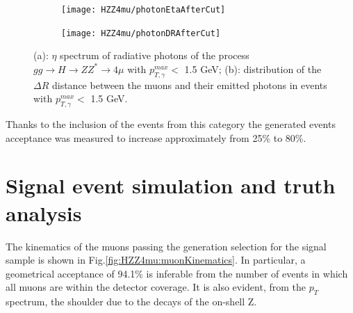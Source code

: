 \documentclass[a4paper,twoside,12pt]{book}
\begin{document}
\begin{figure}
\centering
\begin{subfigure}{.5\textwidth}
  \centering
  \texttt{[image: HZZ4mu/photonEtaAfterCut]}
  \caption{}
  \label{fig:HZZ4mu:photonEtaAfterCut}
\end{subfigure}%
\begin{subfigure}{.5\textwidth}
  \centering
  \texttt{[image: HZZ4mu/photonDRAfterCut]}
  \caption{}
  \label{fig:HZZ4mu:photonDRAfterCut}
\end{subfigure}
\caption{(a): $\eta$ spectrum of radiative photons of the process \\
	 \mbox{$gg \rightarrow H \rightarrow ZZ^* \rightarrow 4\mu$} with $p^{max}_{T, \gamma} <$ 1.5 GeV; 
	(b): distribution of the $\Delta R$ distance between the muons and their emitted photons in events with $p^{max}_{T, \gamma} <$ 1.5 GeV.}
\label{fig:HZZ4mu:genPhotonsAfterCut}
\end{figure}

Thanks to the inclusion of the events from this category the generated events acceptance was measured to increase approximately from 25\% to 80\%.\\

\section{Signal event simulation and truth analysis}

The kinematics of the muons passing the generation selection for the 
signal sample is shown in 
Fig.\ref{fig:HZZ4mu:muonKinematics}. In particular, a geometrical acceptance of 94.1\%
is inferable from the number of events in which all muons are within the detector
coverage. It is also evident, from the $p_{T}$ spectrum, the shoulder due to the decays
of the on-shell Z.\\
\end{document}
